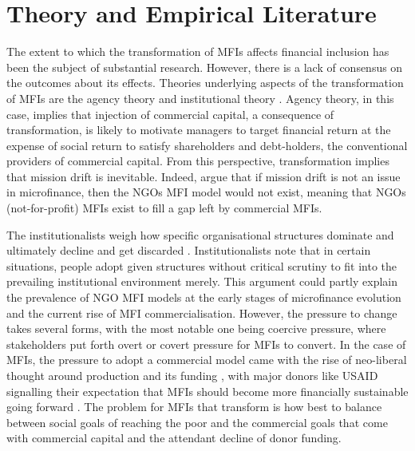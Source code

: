 \documentclass[a4paper,nobind]{templates/ociamthesis}
\begin{document}
\hypertarget{theory-and-empirical-literature}{%
\section{\texorpdfstring{\textbf{Theory and Empirical Literature}}{Theory and Empirical Literature}}\label{theory-and-empirical-literature}}

The extent to which the transformation of MFIs affects financial inclusion has been the subject of substantial research. However, there is a lack of consensus on the outcomes about its effects. Theories underlying aspects of the transformation of MFIs are the agency theory \autocite{jensen1976theory} and institutional theory \autocite{powell2012new}. Agency theory, in this case, implies that injection of commercial capital, a consequence of transformation, is likely to motivate managers to target financial return at the expense of social return to satisfy shareholders and debt-holders, the conventional providers of commercial capital. From this perspective, transformation implies that mission drift is inevitable. Indeed, \textcite{morduch2019challenges} argue that if mission drift is not an issue in microfinance, then the NGOs MFI model would not exist, meaning that NGOs (not-for-profit) MFIs exist to fill a gap left by commercial MFIs.

The institutionalists weigh how specific organisational structures dominate and ultimately decline and get discarded \autocite{powell2012new}. Institutionalists note that in certain situations, people adopt given structures without critical scrutiny to fit into the prevailing institutional environment merely. This argument could partly explain the prevalence of NGO MFI models at the early stages of microfinance evolution and the current rise of MFI commercialisation. However, the pressure to change takes several forms, with the most notable one being coercive pressure, where stakeholders put forth overt or covert pressure for MFIs to convert. In the case of MFIs, the pressure to adopt a commercial model came with the rise of neo-liberal thought around production and its funding \autocite{bateman2010doesn}, with major donors like USAID signalling their expectation that MFIs should become more financially sustainable going forward \autocite{d2013unsubsidized}. The problem for MFIs that transform is how best to balance between social goals of reaching the poor and the commercial goals that come with commercial capital and the attendant decline of donor funding.
\end{document}
